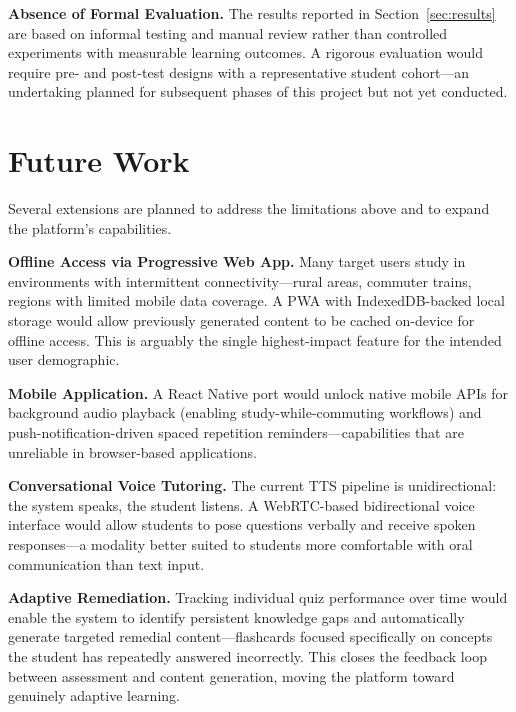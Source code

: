 \documentclass[conference]{IEEEtran}
\begin{document}
\textbf{Absence of Formal Evaluation.} The results reported in Section~\ref{sec:results} are based on informal testing and manual review rather than controlled experiments with measurable learning outcomes. A rigorous evaluation would require pre- and post-test designs with a representative student cohort---an undertaking planned for subsequent phases of this project but not yet conducted.

\section{Future Work}
\label{sec:future}

Several extensions are planned to address the limitations above and to expand the platform's capabilities.

\textbf{Offline Access via Progressive Web App.} Many target users study in environments with intermittent connectivity---rural areas, commuter trains, regions with limited mobile data coverage. A PWA with IndexedDB-backed local storage would allow previously generated content to be cached on-device for offline access. This is arguably the single highest-impact feature for the intended user demographic.

\textbf{Mobile Application.} A React Native port would unlock native mobile APIs for background audio playback (enabling study-while-commuting workflows) and push-notification-driven spaced repetition reminders---capabilities that are unreliable in browser-based applications.

\textbf{Conversational Voice Tutoring.} The current TTS pipeline is unidirectional: the system speaks, the student listens. A WebRTC-based bidirectional voice interface would allow students to pose questions verbally and receive spoken responses---a modality better suited to students more comfortable with oral communication than text input.

\textbf{Adaptive Remediation.} Tracking individual quiz performance over time would enable the system to identify persistent knowledge gaps and automatically generate targeted remedial content---flashcards focused specifically on concepts the student has repeatedly answered incorrectly. This closes the feedback loop between assessment and content generation, moving the platform toward genuinely adaptive learning.

\end{document}
